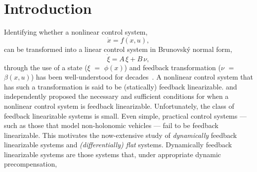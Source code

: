 \documentclass[a4paper]{ifacconf}
\begin{document}
\section{Introduction}
Identifying whether a nonlinear control system,\hfill
\[
  \dot{x} = f(x, u),
\]
can be transformed into a linear control system in Brunovsk\'y normal form,\hfill
\[
  \dot{\xi} = A\,\xi + B\,\nu,
\]
through the use of a state (\(\xi\) \(=\) \(\phi(x)\)) and feedback transformation (\(\nu\) \(=\) \(\beta(x, u)\)) has been well-understood for decades~\citep{isidori_nonlinear_1995}.
A nonlinear control system that has such a transformation is said to be (statically) feedback linearizable.
\cite{hunt_design_1982} and~\cite{jakubczyk_linearization_1980} independently proposed the necessary and sufficient conditions for when a nonlinear control system is feedback linearizable.
Unfortunately, the class of feedback linearizable systems is small.
Even simple, practical control systems --- such as those that model non-holonomic vehicles --- fail to be feedback linearizable.
This motivates the now-extensive study of \emph{dynamically} feedback linearizable systems and \emph{(differentially) flat} systems.
Dynamically feedback linearizable systems are those systems that, under appropriate dynamic precompensation,
%
\begin{center}
\end{center}
\end{document}

